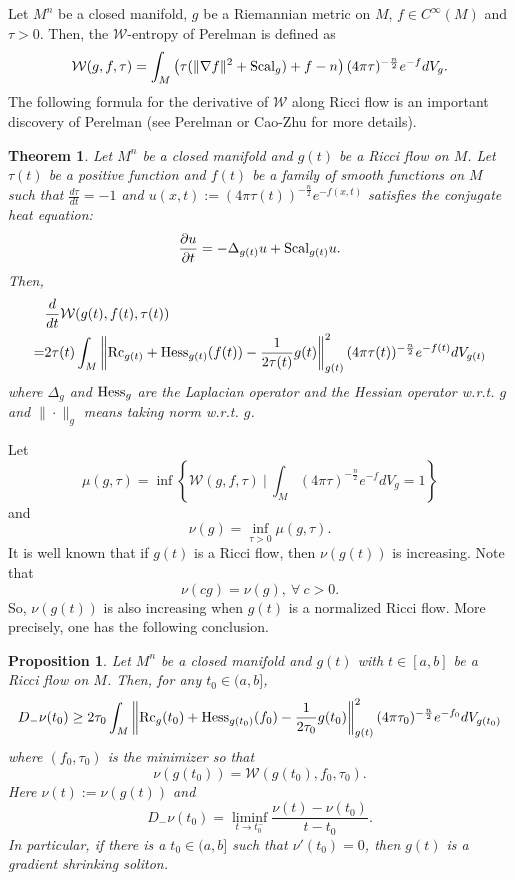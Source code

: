 \documentclass[12pt]{amsart}
\def\Rc{\mbox{Rc}}
\def\p{\partial}
\def\Rc{{\rm Rc}}
\def\Hess{{\rm Hess}}
\def\W{{\mathcal W}}
\def\Scal{{\rm Scal}}
\newtheorem{thm}{Theorem}[section]
\newtheorem{prop}{Proposition}[section]
\theoremstyle{definition}
\theoremstyle{remark}
\numberwithin{equation}{section}
\begin{document}
Let $M^n$ be a closed manifold, $g$ be a Riemannian metric on $M$, $f\in C^\infty(M)$ and $\tau>0$. Then, the $\mathcal W$-entropy of Perelman is defined as 
$$\W(g,f,\tau)=\int_M\left(\tau(\|\nabla f\|^2+\Scal_g)+f-n\right)(4\pi\tau)^{-\frac{n}{2}}e^{-f}dV_g.$$
The following formula for the derivative of $\W$ along Ricci flow is an important   discovery of Perelman (see Perelman \cite{Pe} or Cao-Zhu \cite[P. 206, Proposition 1.5.8]{CZ} for more details). 
\begin{thm}\label{thm-derivative-W}
Let $M^n$ be a closed manifold and $g(t)$ be a Ricci flow on $M$. Let $\tau(t)$ be a positive function and $f(t)$ be a family of smooth functions on $M$ such that $\frac{d\tau}{dt}=-1$ and $u(x,t):=(4\pi\tau(t))^{-\frac{n}{2}}e^{-f(x,t)}$ satisfies the conjugate heat equation:
$$\frac{\p u}{\p t}=-\Delta_{g(t)} u+\Scal_{g(t)}u.$$
Then,
\begin{equation}\label{eq-derivative-W}
\begin{split}
&\frac{d}{dt}\mathcal W(g(t),f(t),\tau(t))\\
=&2\tau(t)\int_M\left\|\Rc_{g(t)}+\Hess_{g(t)}(f(t))-\frac{1}{2\tau(t)}g(t)\right\|_{g(t)}^2(4\pi\tau(t))^{-\frac{n}{2}}e^{-f(t)}dV_{g(t)}
\end{split}
\end{equation}
where $\Delta_g$ and $\Hess_g$ are the Laplacian operator and the Hessian operator w.r.t. $g$ and $\|\cdot\|_g$ means taking norm w.r.t. $g$.
\end{thm}
Let 
$$\mu(g,\tau)=\inf\left\{\mathcal W(g,f,\tau)\ \bigg|\ \int_M(4\pi\tau)^{-\frac{n}{2}}e^{-f}dV_g=1\right\}$$
and 
$$\nu(g)=\inf_{\tau>0}\mu(g,\tau).$$
It is well known that if $g(t)$ is a Ricci flow, then $\nu(g(t))$ is increasing. Note that 
\begin{equation}\label{eq-scale-inv}
\nu(cg)=\nu(g),\ \forall\ c>0.
\end{equation}
So, $\nu(g(t))$ is also increasing when $g(t)$ is a normalized Ricci flow. More precisely, one has the following conclusion.
\begin{prop}\label{prop-derivative-nu}
Let $M^n$ be a closed manifold and $g(t)$ with $t\in [a,b]$ be a Ricci flow on $M$. Then, for any $t_0\in (a,b]$, 
\begin{equation}\label{eq-derivative-nu}
D_-\nu(t_0)\geq 2\tau_0\int_M\left\|\Rc_g(t_0)+\Hess_{g(t_0)}(f_0)-\frac{1}{2\tau_0}g(t_0)\right\|_{g(t)}^2(4\pi \tau_0)^{-\frac{n}{2}}e^{-f_0}dV_{g(t_0)}
\end{equation}
where $(f_0,\tau_0)$ is the minimizer so that 
$$\nu(g(t_0))=\W(g(t_0),f_0,\tau_0).$$
Here $\nu(t):=\nu(g(t))$ and 
$$D_-\nu(t_0)=\liminf_{t\to t_0^-}\frac{\nu(t)-\nu(t_0)}{t-t_0}.$$
In particular, if there is a $t_0\in (a,b]$ such that $\nu'(t_0)=0$, then $g(t)$ is a gradient shrinking soliton. 
\end{prop}
\end{document}
